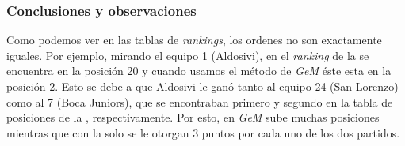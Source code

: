			\subsubsection*{Conclusiones y observaciones}

			Como podemos ver en las tablas de \emph{rankings}, los ordenes no son exactamente iguales. Por ejemplo, mirando el equipo 1 (Aldosivi), en el \emph{ranking} de la  se encuentra en la posición 20 y cuando usamos el método de \emph{GeM} éste esta en la posición 2. Esto se debe a que Aldosivi le ganó tanto al equipo 24 (San Lorenzo) como al 7 (Boca Juniors), que se encontraban primero y segundo en la tabla de posiciones de la , respectivamente. Por esto, en \emph{GeM} sube muchas posiciones mientras que con la  solo se le otorgan 3 puntos por cada uno de los dos partidos.


